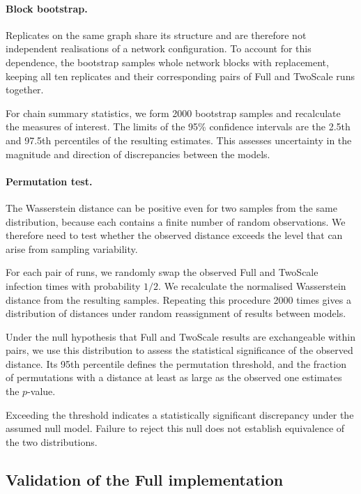 \documentclass{ieeeaccess}
\newcommand{\michael}[2]{{\color{RoyalBlue}#1}}
\newcommand{\Full}{\textup{Full}}
\newcommand{\TS}{\textup{TwoScale}}
\begin{document}
\paragraph{Block bootstrap.}
Replicates on the same graph share its structure and are therefore not independent realisations of a network configuration. To account for this dependence, the bootstrap samples whole network blocks with replacement, keeping all ten replicates and their corresponding pairs of \Full{} and \TS{} runs together.

For chain summary statistics, we form 2000 bootstrap samples and recalculate the measures of interest. The limits of the 95\% confidence intervals are the 2.5th and 97.5th percentiles of the resulting estimates. This assesses uncertainty in the magnitude and direction of discrepancies between the models.

\paragraph{Permutation test.}
The Wasserstein distance can be positive even for two samples from the same distribution, because each contains a finite number of random observations. We therefore need to test whether the observed distance exceeds the level that can arise from sampling variability.

For each pair of runs, we randomly swap the observed \Full{} and \TS{} infection times with probability $1/2$. We recalculate the normalised Wasserstein distance from the resulting samples. Repeating this procedure 2000 times gives a distribution of distances under random reassignment of results between models.

Under the null hypothesis that \Full{} and \TS{} results are exchangeable within pairs, we use this distribution to assess the statistical significance of the observed distance. Its 95th percentile defines the permutation threshold, and the fraction of permutations with a distance at least as large as the observed one estimates the $p$-value.

\michael{Exceeding the threshold indicates a statistically significant discrepancy under the assumed null model. Failure to reject this null does not establish equivalence of the two distributions.}{Exceeding the threshold indicates a statistically significant discrepancy under the assumed null model.}

\subsection{Validation of the Full implementation}
\end{document}
